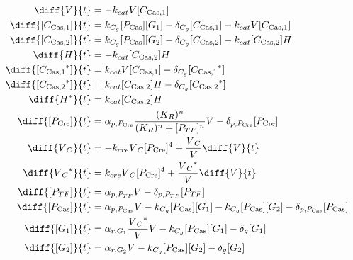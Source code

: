 \begin{align}
\diff{\vectorGen{}}{t} & = - \casCutRate{{}}\vectorGen{}\conc{\cplx{\cas}{1}}\\
\diff{\conc{\cplx{\cas}{1}}}{t} & =  \gRnaBind{}\conc{\proSp{\cas{}}}\conc{\gRna{1}} - \casCompDegradeRate{}\conc{\cplx{\cas}{1}} - \casCutRate{{}}\vectorGen{}\conc{\cplx{\cas}{1}}\\
\diff{\conc{\cplx{\cas}{2}}}{t} & =  \gRnaBind{}\conc{\proSp{\cas{}}}\conc{\gRna{2}} - \casCompDegradeRate{}\conc{\cplx{\cas}{2}} - \casCutRate{{}}\conc{\cplx{\cas}{2}}\hostGen{}\\
\diff{\hostGen{}}{t} & = - \casCutRate{{}}\conc{\cplx{\cas}{2}}\hostGen{}\\
\diff{\conc{\bound{\cplx{\cas}{1}}}}{t} & =  \casCutRate{{}}\vectorGen{}\conc{\cplx{\cas}{1}} - \casCompDegradeRate{}\conc{\bound{\cplx{\cas}{1}}}\\
\diff{\conc{\bound{\cplx{\cas}{2}}}}{t} & =  \casCutRate{{}}\conc{\cplx{\cas}{2}}\hostGen{} - \casCompDegradeRate{}\conc{\bound{\cplx{\cas}{2}}}\\
\diff{\edited{\hostGen{}}}{t} & =  \casCutRate{{}}\conc{\cplx{\cas}{2}}\hostGen{}\\
\diff{\conc{\proSp{\cre{}}}}{t} & =  \txtlRate{\proSp{\cre{}}}\frac{(K_R)^n}{(K_R)^n + \conc{\proSp{TF}}^n}\vectorGen{} - \proDegradeRate{\proSp{\cre{}}}\conc{\proSp{\cre{}}}\\
\diff{\vectorGen{}_C}{t} & = - \creCutRate{} \vectorGen{}_C \conc{\proSp{\cre{}}}^4 + \frac{\vectorGen{}_C}{\vectorGen{}} \diff{\vectorGen{}}{t}\\
\diff{\edited{\vectorGen{}_C}}{t} & =  \creCutRate{} \vectorGen{}_C \conc{\proSp{\cre{}}}^4 + \frac{\edited{\vectorGen{}_C}}{\vectorGen{}} \diff{\vectorGen{}}{t}\\
\diff{\conc{\proSp{TF}}}{t} & =  \txtlRate{\proSp{TF}}\vectorGen{} - \proDegradeRate{\proSp{TF}}\conc{\proSp{TF}}\\
\diff{\conc{\proSp{\cas{}}}}{t} & =  \txtlRate{\proSp{\cas{}}}\vectorGen{} - \gRnaBind{}\conc{\proSp{\cas{}}}\conc{\gRna{1}} - \gRnaBind{}\conc{\proSp{\cas{}}}\conc{\gRna{2}} - \proDegradeRate{\proSp{\cas{}}}\conc{\proSp{\cas{}}}\\
\diff{\conc{\gRna{1}}}{t} & =  \txRate{\gRna{1}}\frac{\edited{\vectorGen{}_C}}{\vectorGen{}}\vectorGen{} - \gRnaBind{}\conc{\proSp{\cas{}}}\conc{\gRna{1}} - \rnaDegradeRate{}\conc{\gRna{1}}\\
\diff{\conc{\gRna{2}}}{t} & =  \txRate{\gRna{2}}\vectorGen{} - \gRnaBind{}\conc{\proSp{\cas{}}}\conc{\gRna{2}} - \rnaDegradeRate{}\conc{\gRna{2}}
\end{align}


